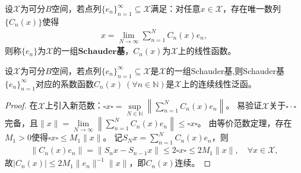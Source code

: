 \documentclass[../../main.tex]{subfiles}%
\begin{document}
\begin{definition}
设$\mathscr{X}$为可分$B$空间，若点列$\{e_n\}_{n=1}^{\infty}\subseteq\mathscr{X}$满足：对任意$x\in\mathscr{X}$，存在唯一数列$\{C_n(x)\}$使得
\begin{align*}
x=\lim\limits_{N\to\infty}\sum\limits_{n=1}^{N}C_n(x)e_n,
\end{align*}
则称$\{e_n\}$为$\mathscr{X}$的一组$\mathbf{Schauder}$\textbf{基}，$C_n(x)$为$\mathscr{X}$上的线性函数。
\end{definition}

\begin{lemma}
设$\mathscr{X}$为可分$B$空间，若点列$\{e_n\}_{n=1}^{\infty}\subseteq\mathscr{X}$是$\mathscr{X}$的一组Schauder基,则Schauder基$\{e_n\}_{n=1}^{\infty}$对应的系数函数$C_n(x)\ (\forall n\in\mathbb{N})$是$\mathscr{X}$上的连续线性泛函。
\end{lemma}

\begin{proof}

在$\mathscr{X}$上引入新范数：$\square x\square=\sup\limits_{N\in\mathbb{N}}\left\|\sum\limits_{n=1}^{N}C_n(x)e_n\right\|$。
易验证$\mathscr{X}$关于$\square\cdot\square$完备，且$\|x\|=\lim\limits_{N\to\infty}\left\|\sum\limits_{n=1}^{N}C_n(x)e_n\right\|\leqslant\square x\square$。
由等价范数定理，存在$M_1>0$使得$\square x\square\leqslant M_1\|x\|$。
记$S_Nx=\sum\limits_{n=1}^{N}C_n(x)e_n$，则
\begin{align*}
\|C_n(x)e_n\|=\|S_nx-S_{n-1}x\|\leqslant2\square x\square\leqslant2M_1\|x\|,\quad \forall x\in\mathscr{X},
\end{align*}
故$|C_n(x)|\leqslant2M_1\|e_n\|^{-1}\|x\|$，即$C_n(x)$连续。

\end{proof}
\end{document}
